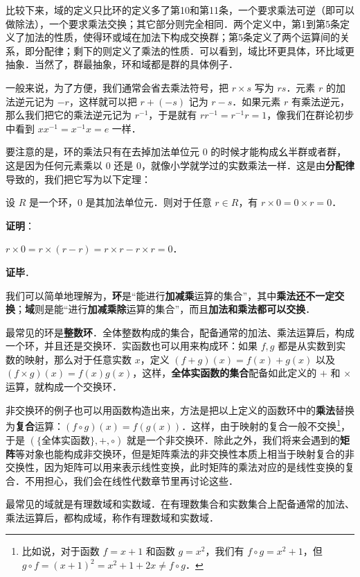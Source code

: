 比较下来，域的定义只比环的定义多了第10和第11条，一个要求乘法可逆（即可以做除法），一个要求乘法交换；其它部分则完全相同．两个定义中，第1到第5条定义了加法的性质，使得环或域在加法下构成交换群；第5条定义了两个运算间的关系，即分配律；剩下的则定义了乘法的性质．可以看到，域比环更具体，环比域更抽象．当然了，群最抽象，环和域都是群的具体例子．

一般来说，为了方便，我们通常会省去乘法符号，把 $r\times s$ 写为 $rs$．元素 $r$ 的加法逆元记为 $-r$，这样就可以把 $r+(-s)$ 记为 $r-s$．如果元素 $r$ 有乘法逆元，那么我们把它的乘法逆元记为 $r^{-1}$，于是就有 $rr^{-1}=r^{-1}r=1$，像我们在群论初步中看到 $xx^{-1}=x^{-1}x=e$ 一样．

要注意的是，环的乘法只有在去掉加法单位元 $0$ 的时候才能构成幺半群或者群，这是因为任何元素乘以 $0$ 还是 $0$，就像小学就学过的实数乘法一样．这是由\textbf{分配律}导致的，我们把它写为以下定理：

\begin{theorem}{}
设 $R$ 是一个环，$0$ 是其加法单位元．则对于任意 $r\in R$，有 $r\times 0=0\times r=0$．
\end{theorem}
\textbf{证明}：

$r\times 0=r\times (r-r)=r\times r-r\times r=0$．

\textbf{证毕}．



我们可以简单地理解为，\textbf{环}是“能进行\textbf{加减乘}运算的集合”，其中\textbf{乘法还不一定交换}；\textbf{域}则是能“进行\textbf{加减乘除}运算的集合”，而且\textbf{加法和乘法都可以交换}．

最常见的环是\textbf{整数环}．全体整数构成的集合，配备通常的加法、乘法运算后，构成一个环，并且还是交换环．实函数也可以用来构成环：如果 $f, g$ 都是从实数到实数的映射，那么对于任意实数 $x$，定义 $(f+g)(x)=f(x)+g(x)$ 以及 $(f\times g)(x)=f(x)g(x)$，这样，\textbf{全体实函数的集合}配备如此定义的 $+$ 和 $\times$ 运算，就构成一个交换环．

非交换环的例子也可以用函数构造出来，方法是把以上定义的函数环中的\textbf{乘法}替换为\textbf{复合}运算：$(f\circ g)(x)=f(g(x))$．这样，由于映射的复合一般不交换\footnote{比如说，对于函数 $f=x+1$ 和函数 $g=x^2$，我们有 $f\circ g=x^2+1$，但 $g\circ f=(x+1)^2=x^2+1+2x\not=f\circ g$．}，于是 $(\{\text{全体实函数}\}, +, \circ)$ 就是一个非交换环．除此之外，我们将来会遇到的\textbf{矩阵}等对象也能构成非交换环，但是矩阵乘法的非交换性本质上相当于映射复合的非交换性，因为矩阵可以用来表示线性变换，此时矩阵的乘法对应的是线性变换的复合．不用担心，我们会在线性代数章节里再讨论这些．

最常见的域就是有理数域和实数域．在有理数集合和实数集合上配备通常的加法、乘法运算后，都构成域，称作有理数域和实数域．

